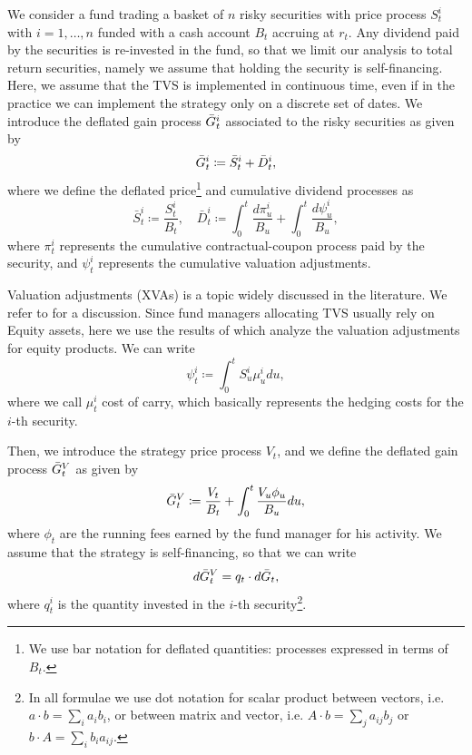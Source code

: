 \documentclass[11pt]{article}
\begin{document}
We consider a fund trading a basket of $n$ risky securities with price process $S_t^i$ with $i=1,\dots,n$ funded with a cash account $B_t$ accruing at $r_t$. Any dividend paid by the securities is re-invested in the fund, so that we limit our analysis to total return securities, namely we assume that holding the security is self-financing. Here, we assume that the TVS is implemented in continuous time, even if in the practice we can implement the strategy only on a discrete set of dates. We introduce the deflated gain process $\Bar{G}_t^i$ associated to the risky securities as given by
\begin{equation}
    \Bar{G}_t^i \coloneqq \Bar{S}_t^i + \Bar{D}_t^i,
\end{equation}
where we define the deflated price\footnote{We use bar notation for deflated quantities: processes expressed in terms of $B_t$.} and cumulative dividend processes as 
\begin{equation}
    \bar{S}_t^i \coloneqq \frac{S_t^i}{B_t}, \quad \bar{D}^i_t \coloneqq \int_0^t\frac{d\pi_u^i}{B_u} + \int_0^t\frac{d\psi_u^i}{B_u},
\end{equation}
where $\pi^i_t$ represents the cumulative contractual-coupon process paid by the security, and $\psi_t^i$ represents the cumulative valuation adjustments.

Valuation adjustments (XVAs) is a topic widely discussed in the literature. We refer to \textcite{Brigo} for a discussion. Since fund managers allocating TVS usually rely on Equity assets, here we use the results of \textcite{Gabrielli} which  analyze the valuation adjustments for equity products. We can write
\begin{equation}
    \psi_t^i \coloneqq \int_0^t S_u^i\mu_u^i du,
\label{eq:XVA_equity}\end{equation}
where we call $\mu_t^i$ cost of carry, which basically represents the hedging costs for the $i$-th security.

Then, we introduce the strategy price process $V_t$, and we define the deflated gain process $\Bar{G}_t^V$ as given by
\begin{equation}
    \Bar{G}_t^V \coloneqq \frac{V_t}{B_t} + \int_0^t\frac{V_u\phi_u}{B_u}du,
\end{equation}
where $\phi_t$ are the running fees earned by the fund manager for his activity. We assume that the strategy is self-financing, so that we can write
\begin{equation}
    d\Bar{G}_t^V = q_t \cdot d\bar{G}_t,
\label{eq:self_financing}\end{equation}
where $q_t^i$ is the quantity invested in the $i$-th security\footnote{In all formulae we use dot notation for scalar product between vectors, i.e. $a \cdot b = \sum_i a_i b_i$, or between matrix and vector, i.e. $A \cdot b = \sum_j a_{ij}b_j$ or $b \cdot A = \sum_i b_i a_{ij}$.}.
\end{document}
